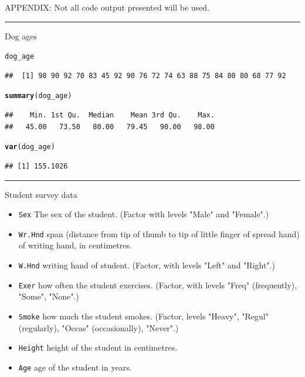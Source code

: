 \documentclass{article}\usepackage[]{graphicx}\usepackage[]{color}
\makeatletter
\newcommand{\hlstd}[1]{\textcolor[rgb]{0.345,0.345,0.345}{#1}}%
\newcommand{\hlkwd}[1]{\textcolor[rgb]{0.737,0.353,0.396}{\textbf{#1}}}%
\newenvironment{kframe}{%
 \def\at@end@of@kframe{}%
 \ifinner\ifhmode%
  \def\at@end@of@kframe{\end{minipage}}%
  \begin{minipage}{\columnwidth}%
 \fi\fi%
 \def\FrameCommand##1{\hskip\@totalleftmargin \hskip-\fboxsep
 \colorbox{shadecolor}{##1}\hskip-\fboxsep
     \hskip-\linewidth \hskip-\@totalleftmargin \hskip\columnwidth}%
 \MakeFramed {\advance\hsize-\width
   \@totalleftmargin\z@ \linewidth\hsize
   \@setminipage}}%
 {\par\unskip\endMakeFramed%
 \at@end@of@kframe}
\newenvironment{knitrout}{}{} %
\newcommand{\R}[1]{\texttt{#1}}
\makeatother
\begin{document}
\newpage
\singlespace
\Huge APPENDIX: \normalsize Not all code output presented will be used.


\noindent\rule{7in}{0.4pt}

\large Dog ages \normalsize
\begin{knitrout}
\color{fgcolor}\begin{kframe}
\begin{alltt}
\hlstd{dog_age}
\end{alltt}
\begin{verbatim}
##  [1] 98 90 92 70 83 45 92 90 76 72 74 63 88 75 84 80 80 68 77 92
\end{verbatim}
\begin{alltt}
\hlkwd{summary}\hlstd{(dog_age)}
\end{alltt}
\begin{verbatim}
##    Min. 1st Qu.  Median    Mean 3rd Qu.    Max. 
##   45.00   73.50   80.00   79.45   90.00   98.00
\end{verbatim}
\begin{alltt}
\hlkwd{var}\hlstd{(dog_age)}
\end{alltt}
\begin{verbatim}
## [1] 155.1026
\end{verbatim}
\end{kframe}
\end{knitrout}

\noindent\rule{7in}{0.4pt}

\large Student survey data \normalsize
\begin{itemize}
  \item \R{Sex} The sex of the student. (Factor with levels "Male" and "Female".)
  \item \R{Wr.Hnd} span (distance from tip of thumb to tip of little finger of spread hand) of writing hand, in centimetres.
  \item \R{W.Hnd} writing hand of student. (Factor, with levels "Left" and "Right".)
  \item \R{Exer} how often the student exercises. (Factor, with levels "Freq" (frequently), "Some", "None".)
  \item \R{Smoke} how much the student smokes. (Factor, levels "Heavy", "Regul" (regularly), "Occas" (occasionally), "Never".)
  \item \R{Height} height of the student in centimetres.
  \item \R{Age} age of the student in years.
\end{itemize}
\end{document}
